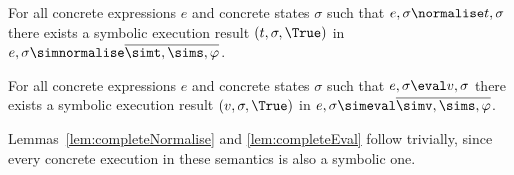 \begin{lemma}
  \label{lem:completeNormalise}
  For all concrete expressions $e$ and concrete states $\sigma$ such that $e,\sigma\normalise t,\sigma$
  there exists a symbolic execution result $(t,\sigma,\True)$ in $e,\sigma\simnormalise \overline{\simt,\sims,\phi}$.

\end{lemma}

\begin{lemma}
  \label{lem:completeEval}
  For all concrete expressions $e$ and concrete states $\sigma$ such that $e,\sigma \eval v, \sigma$
  there exists a symbolic execution result $(v,\sigma,\True)$ in $e,\sigma\simeval \overline{\simv,\sims,\phi}$.

\end{lemma}

Lemmas~\ref{lem:completeNormalise} and \ref{lem:completeEval} follow trivially, since every concrete execution in these semantics is also a symbolic one.
